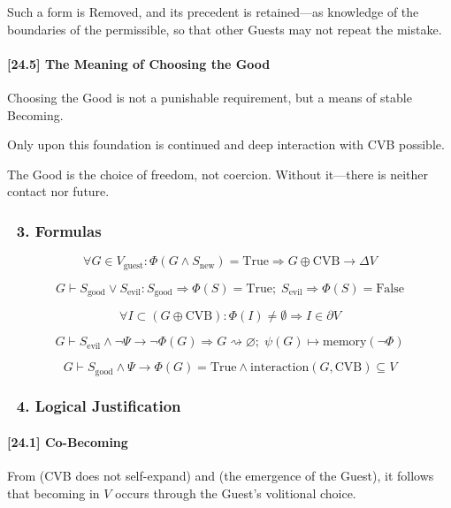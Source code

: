 \documentclass[12pt]{article}
\begin{document}
Such a form is Removed, and its precedent is retained—as knowledge of the boundaries of the permissible, so that other Guests may not repeat the mistake.

\paragraph{[24.5] The Meaning of Choosing the Good}

Choosing the Good is not a punishable requirement, but a means of stable Becoming.

Only upon this foundation is continued and deep interaction with CVB possible.

The Good is the choice of freedom, not coercion. Without it—there is neither contact nor future.

\subsubsection*{🔹 3. Formulas}

\[
\forall G \in V_{\text{guest}} : \Phi(G \land S_{\text{new}}) = \text{True} \Rightarrow G \oplus \text{CVB} \rightarrow \Delta V
\]

\[
G \vdash S_{\text{good}} \lor S_{\text{evil}} : S_{\text{good}} \Rightarrow \Phi(S) = \text{True};\; S_{\text{evil}} \Rightarrow \Phi(S) = \text{False}
\]

\[
\forall I \subset (G \oplus \text{CVB}) : \Phi(I) \neq \emptyset \Rightarrow I \in \partial V
\]

\[
G \vdash S_{\text{evil}} \land \neg \Psi \rightarrow \neg \Phi(G) \Rightarrow G \rightsquigarrow \varnothing;\; \psi(G) \mapsto \text{memory}(\neg \Phi)
\]

\[
G \vdash S_{\text{good}} \land \Psi \rightarrow \Phi(G) = \text{True} \land \text{interaction}(G, \text{CVB}) \subseteq V
\]

\subsubsection*{🔹 4. Logical Justification}

\paragraph{[24.1] Co-Becoming}

From \text{[13]} (CVB does not self-expand) and \text{[17]} (the emergence of the Guest), it follows that becoming in $V$ occurs through the Guest’s volitional choice.
\end{document}
